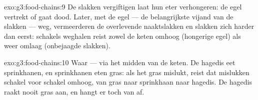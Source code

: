 \begin{solution}{exo:g3:food-chains:9}
De slakken vergiftigen laat hun eter verhongeren: de egel vertrekt of
gaat dood. Later, met de egel --- de belangrijkste vijand van de
slakken --- weg, vermeerderen de overlevende naaktslakken en slakken
zich harder dan eerst: schakels weghalen reist zowel de keten omhoog
(hongerige egel) als weer omlaag (onbejaagde slakken).
\end{solution}

\begin{solution}{exo:g3:food-chains:10}
Waar --- via het midden van de keten. De hagedis eet sprinkhanen, en
sprinkhanen eten gras: als het gras mislukt, reist dat mislukken
schakel voor schakel omhoog, van gras naar sprinkhaan naar hagedis. De
hagedis raakt nooit gras aan, en hangt er toch van af.
\end{solution}
